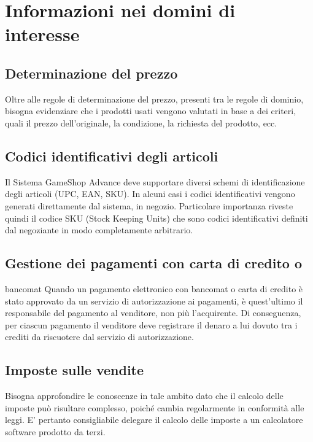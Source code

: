 \documentclass[a4paper,10pt]{report}
\begin{document}
\section*{Informazioni nei domini di interesse}

\subsection*{Determinazione del prezzo}
Oltre alle regole di determinazione del prezzo, presenti tra le regole di dominio, bisogna evidenziare che i prodotti usati vengono valutati in base a dei criteri, quali il prezzo dell'originale, la condizione, la richiesta del prodotto, ecc. 

\subsection*{Codici identificativi degli articoli}
Il Sistema GameShop Advance deve supportare diversi schemi di identificazione degli articoli (UPC, EAN, SKU). In alcuni casi i codici identificativi vengono generati direttamente dal sistema, in negozio. Particolare importanza riveste quindi il codice SKU (Stock Keeping Units) che sono codici identificativi definiti dal negoziante in modo completamente arbitrario.

\subsection*{Gestione dei pagamenti con carta di credito o} bancomat
Quando un pagamento elettronico con bancomat o carta di credito è stato approvato da un servizio di autorizzazione ai pagamenti, è quest’ultimo il responsabile del pagamento al venditore, non più l’acquirente. Di conseguenza, per ciascun pagamento il venditore deve registrare il denaro a lui dovuto tra i crediti da riscuotere dal servizio di autorizzazione.

\subsection*{Imposte sulle vendite}
Bisogna approfondire le conoscenze in tale ambito dato che il calcolo delle imposte può risultare complesso, poiché cambia regolarmente in conformità alle leggi. E’ pertanto consigliabile delegare il calcolo delle imposte a un calcolatore software prodotto da terzi.
\end{document}
